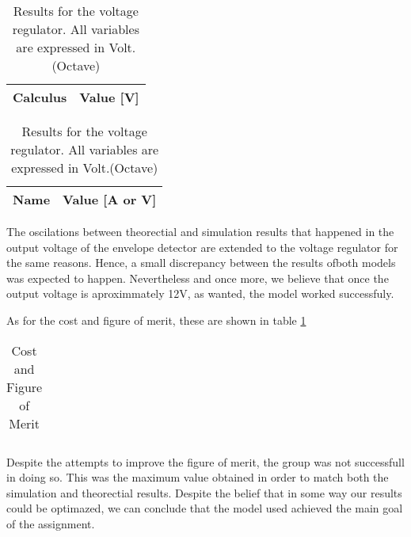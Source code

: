 \begin{table}[ht]
\parbox{.45\linewidth}{
  \centering
  \begin{tabular}{|l|r|}
    \hline    
    {\bf Calculus} & {\bf Value [V]} \\ \hline
    
  \end{tabular}
  \caption{Results for the voltage regulator. All variables are expressed in Volt. (Ngspice)}} 
\parbox{.45\linewidth}{
  \centering
  \begin{tabular}{|l|r|}
    \hline    
    {\bf Name} & {\bf Value [A or V]} \\ \hline
    
  \end{tabular}
  \caption{Results for the voltage regulator. All variables are expressed in Volt.(Octave)}}
 
\end{table}

\par The oscilations between theorectial and simulation results that happened in the output voltage of the envelope detector are extended to the voltage regulator for the same reasons. Hence, a small discrepancy between the results ofboth models was expected to happen. Nevertheless and once more, we believe that once the output voltage is aproximmately 12V, as wanted, the model worked successfuly.



As for the cost and figure of merit, these are shown in table \ref{tab:merit}

\begin{table}[ht]
  \centering
  \begin{tabular}{|l|r|}
    \hline    
    
  \end{tabular}
  \caption{Cost and Figure of Merit}
  \label{tab:merit}
\end{table}

\par Despite the attempts to improve the figure of merit, the group was not successfull in doing so. This was the maximum value obtained in order to match both the simulation and theorectial results. Despite the belief that in some way our results could be optimazed, we can conclude that the model used achieved the main goal of the assignment.
